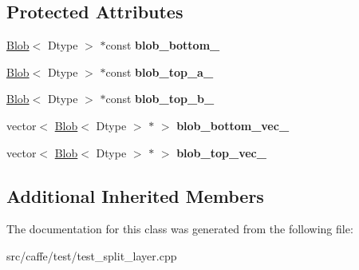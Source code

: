 \subsection*{Protected Attributes}
\begin{DoxyCompactItemize}
\item 
\mbox{\label{classcaffe_1_1_split_layer_test_a840c8ce4fc13f25abf5928ef32ae53d6}} 
\mbox{\hyperlink{classcaffe_1_1_blob}{Blob}}$<$ Dtype $>$ $\ast$const {\bfseries blob\+\_\+bottom\+\_\+}
\item 
\mbox{\label{classcaffe_1_1_split_layer_test_a6ae1eab46bde283ac737784a116d0507}} 
\mbox{\hyperlink{classcaffe_1_1_blob}{Blob}}$<$ Dtype $>$ $\ast$const {\bfseries blob\+\_\+top\+\_\+a\+\_\+}
\item 
\mbox{\label{classcaffe_1_1_split_layer_test_a170a21fd105c57ac061b777ba473d76a}} 
\mbox{\hyperlink{classcaffe_1_1_blob}{Blob}}$<$ Dtype $>$ $\ast$const {\bfseries blob\+\_\+top\+\_\+b\+\_\+}
\item 
\mbox{\label{classcaffe_1_1_split_layer_test_a3a7f88497f9b9e7b9cfe7d13c04849cf}} 
vector$<$ \mbox{\hyperlink{classcaffe_1_1_blob}{Blob}}$<$ Dtype $>$ $\ast$ $>$ {\bfseries blob\+\_\+bottom\+\_\+vec\+\_\+}
\item 
\mbox{\label{classcaffe_1_1_split_layer_test_a5c7f799564e789adddd3891803896a14}} 
vector$<$ \mbox{\hyperlink{classcaffe_1_1_blob}{Blob}}$<$ Dtype $>$ $\ast$ $>$ {\bfseries blob\+\_\+top\+\_\+vec\+\_\+}
\end{DoxyCompactItemize}
\subsection*{Additional Inherited Members}


The documentation for this class was generated from the following file\+:\begin{DoxyCompactItemize}
\item 
src/caffe/test/test\+\_\+split\+\_\+layer.\+cpp\end{DoxyCompactItemize}
